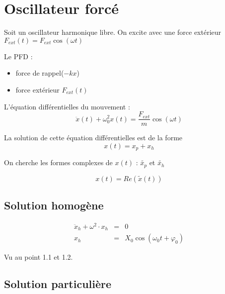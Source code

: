 \section{Oscillateur forcé}

Soit un oscillateur harmonique libre. On excite avec une force extérieur $F_{ext}(t) = F_{ext}\cos(\omega t)$

Le PFD :
\begin{itemize}
	\item force de rappel($-kx$)
	\item force extérieur $F_{ext}(t)$
\end{itemize}

L'équation différentielles du mouvement : \[\ddot{x}(t)+\omega_0^2 x(t) = \frac{F_{ext}}{m}\cos(\omega t)\]

La solution de cette équation différentielles est de la forme \[x(t) = x_p + x_h\]

On cherche les formes complexes de $x(t)$ : $\tilde{x_p}$ et $\tilde{x_h}$

\[x(t) = Re(\tilde{x}(t))\]

\subsection{Solution homogène}
\[\begin{array}{rcl}
		\ddot{x}_h + \omega^2 \cdot x_h &=& 0 \\
		x_h &=& X_0\cos(\omega_0 t + \varphi_0) 
	\end{array}
\]

Vu au point 1.1 et 1.2.

\subsection{Solution particulière}

